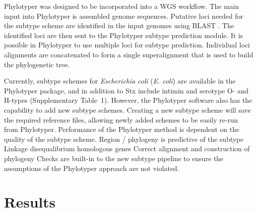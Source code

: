 \documentclass{bioinfo}
\begin{document}
Phylotyper was designed to be incorporated into a WGS workflow.  
The main input into Phylotyper is assembled genome sequences.  
Putative loci needed for the subtype scheme are identified in the input genomes using BLAST \citep{Camacho2009}.
The identified loci are then sent to the Phylotyper subtype prediction module.
It is possible in Phylotyper to use multiple loci for subtype prediction.
Individual loci alignments are concatenated to form a single superalignment that is used to build the phylogenetic tree.

Currently, subtype schemes for \emph{Escherichia coli} (\textit{E. coli}) are available in the Phylotyper package, and in addition to Stx include intimin and serotype O- and H-types  (Supplementary Table~1).
However, the Phylotyper software also has the capability to add new subtype schemes. 
Creating a new subtype scheme will save the required reference files, allowing newly added schemes to be easily re-run from Phylotyper.
Performance of the Phylotyper method is dependent on the quality of the subtype scheme.
Region / phylogeny is predictive of the subtype
Linkage disequalibrium
homologous genes
Correct alignment and construction of phylogeny
Checks are built-in to the new subtype pipeline to ensure the assumptions of the Phylotyper approach are not violated.  

\section{Results}
\end{document}

